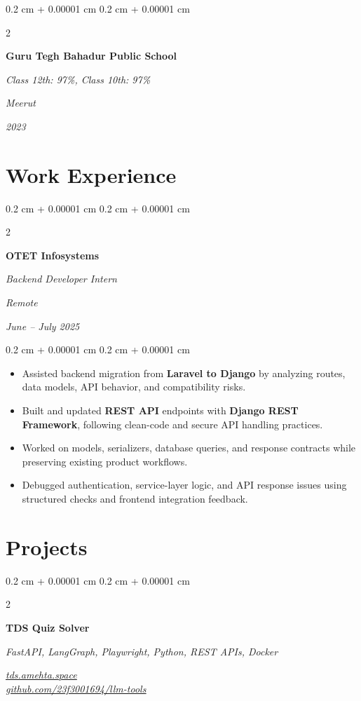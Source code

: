 \documentclass[10pt, letterpaper]{article}
\newenvironment{highlights}{
    \begin{itemize}[
        topsep=0.02 cm,
        parsep=0.02 cm,
        partopsep=0pt,
        itemsep=0pt,
        leftmargin=0.4 cm + 10pt
    ]
}{
    \end{itemize}
} %
\newenvironment{onecolentry}{
    \begin{adjustwidth}{
        0.2 cm + 0.00001 cm
    }{
        0.2 cm + 0.00001 cm
    }
}{
    \end{adjustwidth}
} %
\newenvironment{twocolentry}[2][]{
    \onecolentry
    \def\secondColumn{#2}
    \setcolumnwidth{\fill, 6.8 cm}
    \begin{paracol}{2}
}{
    \switchcolumn \raggedleft \secondColumn
    \end{paracol}
    \endonecolentry
} %
\let\hrefWithoutArrow\href
\renewcommand{\href}[2]{\hrefWithoutArrow{#1}{\uline{#2}}}
\newcommand{\printlink}[2]{\href{#1}{#2}}
\begin{document}
        \vspace{0.10 cm}

        \begin{twocolentry}{
        \textit{Meerut}

        \textit{2023}}
            \textbf{Guru Tegh Bahadur Public School}

            \textit{Class 12th: 97\%, Class 10th: 97\%}
        \end{twocolentry}


    \section{Work Experience}

        \begin{twocolentry}{
        \textit{Remote}

        \textit{June -- July 2025}}
            \textbf{OTET Infosystems}

            \textit{Backend Developer Intern}
        \end{twocolentry}

        \vspace{0.02 cm}
        \begin{onecolentry}
            \begin{highlights}
                \item Assisted backend migration from \textbf{Laravel to Django} by analyzing routes, data models, API behavior, and compatibility risks.
                \item Built and updated \textbf{REST API} endpoints with \textbf{Django REST Framework}, following clean-code and secure API handling practices.
                \item Worked on models, serializers, database queries, and response contracts while preserving existing product workflows.
                \item Debugged authentication, service-layer logic, and API response issues using structured checks and frontend integration feedback.
            \end{highlights}
        \end{onecolentry}


    \section{Projects}

        \begin{twocolentry}{
        \textit{\footnotesize \printlink{https://tds.amehta.space}{tds.amehta.space}\\\printlink{https://github.com/23f3001694/llm-tools}{github.com/23f3001694/llm-tools}}}
            \textbf{TDS Quiz Solver}

            \textit{FastAPI, LangGraph, Playwright, Python, REST APIs, Docker}
        \end{twocolentry}
\end{document}
